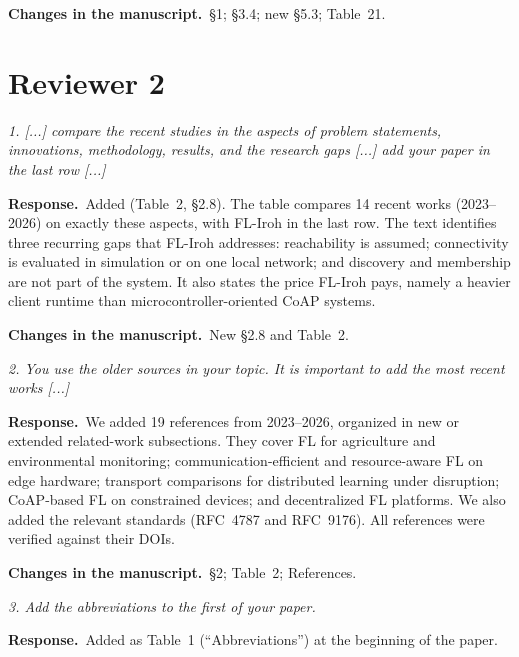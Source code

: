 \documentclass[11pt,a4paper]{article}
\newenvironment{comment}{\par\medskip\noindent\begin{minipage}{\linewidth}\color{blue!45!black}\itshape}{\end{minipage}\par}
\newcommand{\reply}{\par\smallskip\noindent\textbf{Response.}~}
\newcommand{\changes}{\par\smallskip\noindent\textbf{Changes in the manuscript.}~}
\begin{document}
\changes \S1; \S3.4; new \S5.3; Table~21.

\section*{Reviewer 2}

\begin{comment}
1. [...] compare the recent studies in the aspects of problem statements, innovations, methodology, results, and the research gaps [...] add your paper in the last row [...]
\end{comment}
\reply Added (Table~2, \S2.8). The table compares 14 recent works (2023--2026) on exactly these aspects, with FL-Iroh in the last row. The text identifies three recurring gaps that FL-Iroh addresses: reachability is assumed; connectivity is evaluated in simulation or on one local network; and discovery and membership are not part of the system. It also states the price FL-Iroh pays, namely a heavier client runtime than microcontroller-oriented CoAP systems.

\changes New \S2.8 and Table~2.

\begin{comment}
2. You use the older sources in your topic. It is important to add the most recent works [...]
\end{comment}
\reply We added 19 references from 2023--2026, organized in new or extended related-work subsections. They cover FL for agriculture and environmental monitoring; communication-efficient and resource-aware FL on edge hardware; transport comparisons for distributed learning under disruption; CoAP-based FL on constrained devices; and decentralized FL platforms. We also added the relevant standards (RFC~4787 and RFC~9176). All references were verified against their DOIs.

\changes \S2; Table~2; References.

\begin{comment}
3. Add the abbreviations to the first of your paper.
\end{comment}
\reply Added as Table~1 (``Abbreviations'') at the beginning of the paper.
\end{document}
